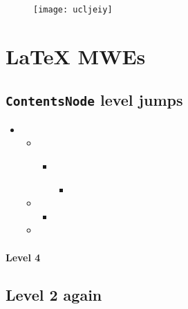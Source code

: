 \begin{figure}[H]
\centering
\texttt{[image: ucljeiy]}
\end{figure}



\chapter{LaTeX MWEs}



\label{1925292743794655301}{}


\section{\texttt{ContentsNode} level jumps}



\label{15118955462992457116}{}

\begin{itemize}
\item {}
\begin{itemize}
\item {}
\begin{itemize}
\item ~
\begin{itemize}
\item {}
\end{itemize}
\end{itemize}
\item {}
\begin{itemize}
\item {}
\end{itemize}
\item {}
\end{itemize}
\end{itemize}


\subsubsection{Level 4}



\label{16707865978221737672}{}


\section{Level 2 again}



